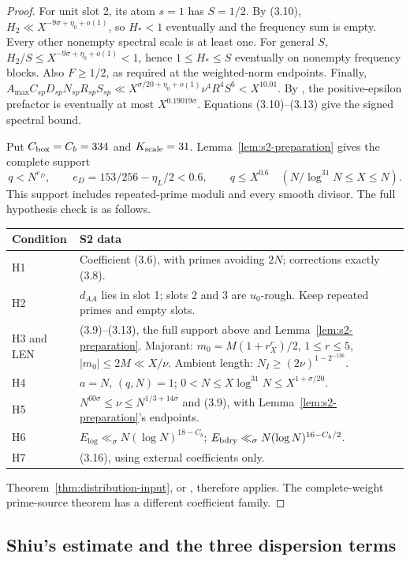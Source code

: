 \begin{proof}
For unit slot 2, its atom $s=1$ has $S=1/2$.
By (3.10), $H_2\ll X^{-9\sigma+\eta_0+o(1)}$,
so $H_*<1$ eventually and the frequency sum is empty.
Every other nonempty spectral scale is at least one.
For general $S$, $H_2/S\le X^{-9\sigma+\eta_0+o(1)}<1$,
hence $1\le H_*\le S$ eventually on nonempty frequency blocks.
Also $F\ge1/2$, as required at the weighted-norm endpoints.
Finally,
$A_{\max}C_{sp}D_{sp}N_{sp}R_{sp}S_{sp}
 \ll X^{\sigma/20+\eta_0+o(1)}\nu^4R^4S^6<X^{10.01}.$
By \cite[(3.89)]{Z1}, the positive-epsilon prefactor is eventually at most $X^{0.19019\sigma}$.
Equations (3.10)--(3.13) give the signed spectral bound.

Put $C_{\rm box}=C_b=334$ and $K_{\rm scale}=31$.
Lemma~\ref{lem:s2-preparation} gives the complete support
\[
 q<N^{e_D},\qquad e_D=153/256-\eta_L/2<0.6,
 \qquad q\le X^{0.6}\quad(N/\log^{31}N\le X\le N).
\]
This support includes repeated-prime moduli and every smooth divisor.
The full hypothesis check is as follows.
\begin{longtable}{@{}p{}p{}@{}}
\toprule
Condition & S2 data \\
\midrule
H1 & Coefficient (3.6), with primes avoiding $2N$; corrections exactly (3.8). \\
H2 & $d_{AA}$ lies in slot 1; slots 2 and 3 are $u_0$-rough.
Keep repeated primes and empty slots. \\
H3 and LEN & (3.9)--(3.13), the full support above and
Lemma~\ref{lem:s2-preparation}.
Majorant: $m_0=M(1+r_X^r)/2$, $1\le r\le5$,
$|m_0|\le2M\ll X/\nu$.
Ambient length: $N_I\ge(2\nu)^{1-2^{-126}}$. \\
H4 & $a=N$, $(q,N)=1$;
$0<N\le X\log^{31}N\le X^{1+\sigma/20}$. \\
H5 & $N^{60\sigma}\le\nu\le N^{1/3+14\sigma}$ and (3.9),
with Lemma~\ref{lem:s2-preparation}'s endpoints. \\
H6 & $E_{\log}\ll_\sigma N(\log N)^{18-C_b}$;
$E_{\rm bdry}\ll_\sigma N(\log N)^{16-C_b/2}$. \\
H7 & (3.16), using external coefficients only. \\
\bottomrule
\end{longtable}
Theorem~\ref{thm:distribution-input}, or
\cite[Theorem~3.2, (3.13)]{Z1}, therefore applies.
The complete-weight prime-source theorem has a different coefficient family.
\end{proof}

\subsection{Shiu's estimate and the three dispersion terms}
\label{sec:s2-4}

